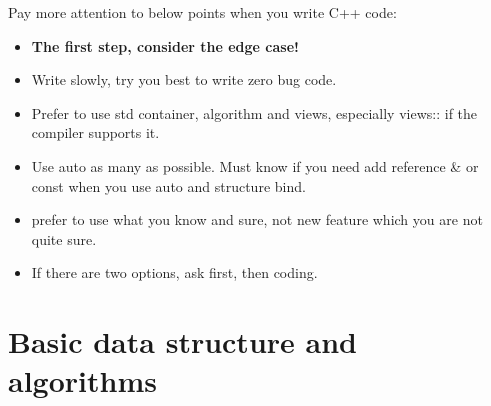 \documentclass[a4paper,11pt,twoside]{book}
\begin{document}
Pay more attention to below points when you write C++ code:

\begin{itemize}
	\item \textbf{The first step, consider the edge case!}
	
	\item Write slowly, try you best to write zero bug code. 
	
	\item Prefer to use std container, algorithm and views, especially views:: if the compiler supports it. 
		
	\item Use auto as many as possible. Must know if you need add reference \& or const when you use auto and structure bind. 
	
	\item prefer to use what you know and sure, not new feature which you are not quite sure. 
	
	\item If there are two options, ask first, then coding. 
\end{itemize}




\section{Basic data structure and algorithms}
\end{document}
